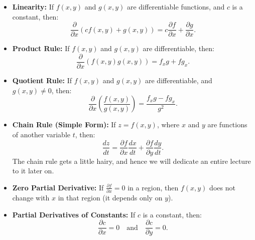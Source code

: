 \begin{itemize}
    \item \textbf{Linearity:} If \( f(x, y) \) and \( g(x, y) \) are differentiable functions, and \( c \) is a constant, then:
    \[
    \frac{\partial}{\partial x}(cf(x, y) + g(x, y)) = c\frac{\partial f}{\partial x} + \frac{\partial g}{\partial x}.
    \]

    \item \textbf{Product Rule:} If \( f(x, y) \) and \( g(x, y) \) are differentiable, then:
    \[
    \frac{\partial}{\partial x}(f(x, y)g(x, y)) = f_x g + f g_x.
    \]

    \item \textbf{Quotient Rule:} If \( f(x, y) \) and \( g(x, y) \) are differentiable, and \( g(x, y) \neq 0 \), then:
    \[
    \frac{\partial}{\partial x}\left(\frac{f(x, y)}{g(x, y)}\right) = \frac{f_x g - f g_x}{g^2}.
    \]

    \item \textbf{Chain Rule (Simple Form):} If \( z = f(x, y) \), where \( x \) and \( y \) are functions of another variable \( t \), then:
    \[
    \frac{dz}{dt} = \frac{\partial f}{\partial x} \frac{dx}{dt} + \frac{\partial f}{\partial y} \frac{dy}{dt}.
    \]
	The chain rule gets a little hairy, and hence we will dedicate an entire lecture to it later on.
    \item \textbf{Zero Partial Derivative:} If \( \frac{\partial f}{\partial x} = 0 \) in a region, then \( f(x, y) \) does not change with \( x \) in that region (it depends only on \( y \)).

    \item \textbf{Partial Derivatives of Constants:} If \( c \) is a constant, then:
    \[
    \frac{\partial c}{\partial x} = 0 \quad \text{and} \quad \frac{\partial c}{\partial y} = 0.
    \]
\end{itemize}


